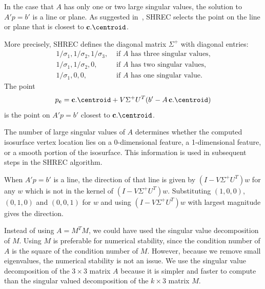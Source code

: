 In the case that $A$ has only one or two large singular values,
the solution to $A' p = b'$ is a line or plane.
As suggested in~\cite{sw-dcss-02},
SHREC selects the point on the line or plane that is closest 
to $\cb.\centroid$.

More precisely, SHREC defines the diagonal matrix $\Sigma^+$
with diagonal entries:
\begin{equation*}
\begin{array}{ll}
1/\sigma_1, 1/\sigma_2, 1/\sigma_3, 
  & \mbox{ if $A$ has three singular values,}\\
1/\sigma_1, 1/\sigma_2, 0, 
  & \mbox{ if $A$ has two singular values,}\\
1/\sigma_1, 0, 0, 
  & \mbox{ if $A$ has one singular value.}
\end{array}
\end{equation*}
The point
\begin{equation}
\label{eqn:Lindstrom}
p_\cb = \cb.\centroid + V \Sigma^+ U^T (b' - A \, \cb.\centroid) 
\end{equation}
is the point on $A' p = b'$ closest to $\cb.\centroid$.

The number of large singular values of $A$ determines
whether the computed isosurface vertex location lies 
on a 0-dimensional feature, a 1-dimensional feature, 
or a smooth portion of the isosurface.
This information is used in subsequent steps in the SHREC algorithm.

When $A' p = b'$ is a line,
the direction of that line is given by $(I - V \Sigma^+ U^T ) w$
for any $w$ which is not in the kernel of $(I - V \Sigma^+ U^T ) w$.
Substituting $(1,0,0)$, $(0,1,0)$ and $(0,0,1)$ for $w$
and using $(I - V \Sigma^+ U^T ) w$ with largest magnitude
gives the direction.

Instead of using $A = M^T M$,
we could have used the singular value decomposition of $M$.
Using $M$ is preferable for numerical stability,
since the condition number of $A$ is the square of the condition number of $M$.
However, because we remove small eigenvalues,
the numerical stability is not an issue.
We use the singular value decomposition of the $3 \times 3$ matrix $A$
because it is simpler and faster to compute 
than the singular valued decomposition of the $k \times 3$ matrix $M$.


